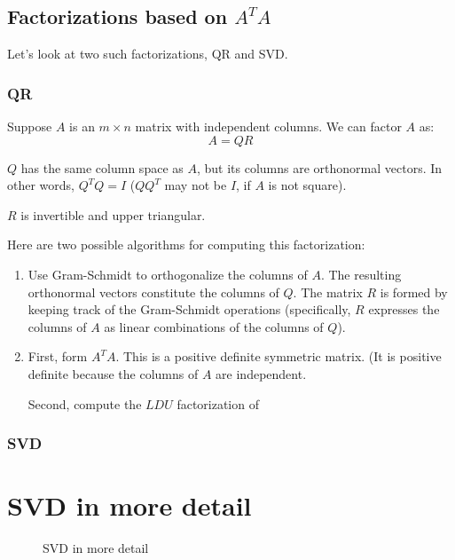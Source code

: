 \subsection{Factorizations based on $A^TA$}

Let's look at two such factorizations, QR and SVD.

\subsubsection{QR}

Suppose $A$ is an $m \times n$ matrix with independent columns. We can factor $A$ as:
\[
    A = QR \tag*{$Q$ is $m \times n$, $R$ is $n \times n$}
\]

$Q$ has the same column space as $A$, but its columns are orthonormal vectors. In other words, $Q^TQ = I$ ($QQ^T$ may not be $I$, if $A$ is not square). 

$R$ is invertible and upper triangular. 

Here are two possible algorithms for computing this factorization:
\begin{enumerate}
    \item Use Gram-Schmidt to orthogonalize the columns of $A$. The resulting orthonormal vectors constitute the columns of $Q$. The matrix $R$ is formed by keeping track of the Gram-Schmidt operations (specifically, $R$ expresses the columns of $A$ as linear combinations of the columns of $Q$). 
    \item First, form $A^TA$. This is a positive definite symmetric matrix. (It is positive definite because the columns of $A$ are independent. 
    
    Second, compute the $LDU$ factorization of 
\end{enumerate}

\subsubsection{SVD}

\section{SVD in more detail}

\begin{figure}
  \centering
  \label{fig:linear-2}
  \caption{SVD in more detail}
  \resizebox{\columnwidth}{!}{
    
  }
\end{figure}
